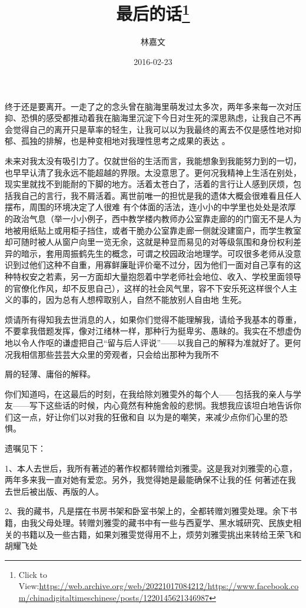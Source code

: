 \documentclass{article}
\title{最后的话\footnote{Click to View:\url{https://web.archive.org/web/20221017084212/https://www.facebook.com/chinadigitaltimeschinese/posts/1220145621346987}}}
\author{林嘉文}
\date{2016-02-23}
\begin{document}

\maketitle


\Large

﻿终于还是要离开。一走了之的念头曾在脑海里萌发过太多次，两年多来每一次对压抑、恐惧的感受都推动着我在脑海里沉淀下今日对生死的深思熟虑，让我自己不再会觉得自己的离开只是草率的轻生，让我可以以为我最终的离去不仅是感性地对抑郁、孤独的排解，也是种变相地对我理性思考之成果的表达
。 

未来对我太没有吸引力了。仅就世俗的生活而言，我能想象到我能努力到的一切，也早早认清了我永远不能超越的界限。太没意思了。更何况我精神上生活在别处，现实里就找不到能耐的下脚的地方。活着太苍白了，活着的言行让人感到厌烦，包括我自己的言行，我不屑活着。离世前唯一的担忧是我的遗体大概会很难看且任人摆布，周围的环境决定了人很难
\newpage
有个体面的活法，连小小的中学里也处处是浓厚的政治气息（举一小小例子，西中教学楼内教师办公室靠走廊的的门窗无不是人为地被用纸贴上或用柜子挡住，或者干脆办公室靠走廊一侧就没建窗户，而学生教室却可随时被人从窗户向里一览无余，这就是种显而易见的对等级氛围和身份权利差异的暗示，套用周振鹤先生的概念，可谓之校园政治地理学。可叹很多老师从没意识到过他们这种不自重，用寡鲜廉耻评价毫不过分，因为他们一面对自己享有的这种特权安之若素，另一方面却大量抱怨着中学老师社会地位、收入、学校里面领导的官僚化作风，却不反思自己），这样的社会风气里，容不下安乐死这样很个人主义的事的，因为总有人想榨取别人，自然不能放别人自由地
生死。 

烦请所有得知我去世消息的人，如果你们觉得不能理解我，请给予我基本的尊重，不要拿我借题发挥，像对江绪林一样，那种行为挺卑劣、愚昧的。我实在不想虚伪地以令人作呕的谦虚把自己“留与后人评说”——以我自己的解释为准就好了。更何况我相信那些芸芸大众里的旁观者，只会给出那种为我所不
\newpage

屑的轻薄、庸俗的解释。 

你们知道吗，在这最后的时刻，在我给除刘雅雯外的每个人——包括我的亲人与学友——写下这些话的时候，内心竟然有种施舍般的悲悯。我想我应该坦白地告诉你们这一点，好让你们以对我的狂傲和自
以为是的嘲笑，来减少点你们心里的恐惧。 


遗嘱见下： 

1、本人去世后，我所有著述的著作权都转赠给刘雅雯。这是我对刘雅雯的心意，两年多来我一直对她有爱恋。另外，我觉得她是最能确保不让我的任
何著述在我去世后被出版、再版的人。　　 

2、我的藏书，凡是摆在书房书架和卧室书架上的，全都转赠刘雅雯处理。余下书籍，由我父母处理。转赠刘雅雯的藏书中有一些与西夏学、黑水城研究、民族史相关的书籍以及一些古籍，如果刘雅雯觉得用不上，烦劳刘雅雯挑出来转给王荣飞和胡耀飞处
\end{document}
